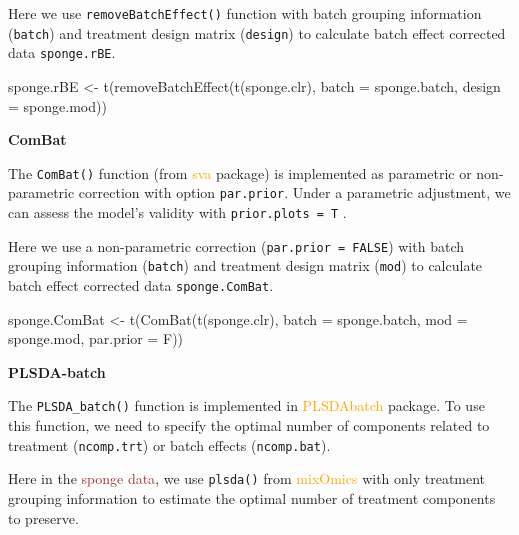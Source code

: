 \documentclass[
]{book}
\newenvironment{Shaded}{\begin{snugshade}}{\end{snugshade}}
\newcommand{\AttributeTok}[1]{\textcolor[rgb]{0.77,0.63,0.00}{#1}}
\newcommand{\FunctionTok}[1]{\textcolor[rgb]{0.00,0.00,0.00}{#1}}
\newcommand{\NormalTok}[1]{#1}
\newcommand{\OtherTok}[1]{\textcolor[rgb]{0.56,0.35,0.01}{#1}}
\begin{document}
Here we use \texttt{removeBatchEffect()} function with batch grouping information (\texttt{batch}) and treatment design matrix (\texttt{design}) to calculate batch effect corrected data \texttt{sponge.rBE}.

\begin{Shaded}
\begin{Highlighting}[]
\NormalTok{sponge.rBE }\OtherTok{\textless{}{-}} \FunctionTok{t}\NormalTok{(}\FunctionTok{removeBatchEffect}\NormalTok{(}\FunctionTok{t}\NormalTok{(sponge.clr), }\AttributeTok{batch =}\NormalTok{ sponge.batch, }
                                  \AttributeTok{design =}\NormalTok{ sponge.mod))}
\end{Highlighting}
\end{Shaded}

\textbf{ComBat}

The \texttt{ComBat()} function (from \textcolor{orange}{sva} package) is implemented as parametric or non-parametric correction with option \texttt{par.prior}. Under a parametric adjustment, we can assess the model's validity with \texttt{prior.plots\ =\ T} \citep{leek2012sva}.

Here we use a non-parametric correction (\texttt{par.prior\ =\ FALSE}) with batch grouping information (\texttt{batch}) and treatment design matrix (\texttt{mod}) to calculate batch effect corrected data \texttt{sponge.ComBat}.

\begin{Shaded}
\begin{Highlighting}[]
\NormalTok{sponge.ComBat }\OtherTok{\textless{}{-}} \FunctionTok{t}\NormalTok{(}\FunctionTok{ComBat}\NormalTok{(}\FunctionTok{t}\NormalTok{(sponge.clr), }\AttributeTok{batch =}\NormalTok{ sponge.batch, }
                          \AttributeTok{mod =}\NormalTok{ sponge.mod, }\AttributeTok{par.prior =}\NormalTok{ F))}
\end{Highlighting}
\end{Shaded}

\textbf{PLSDA-batch}

The \texttt{PLSDA\_batch()} function is implemented in \textcolor{orange}{PLSDAbatch} package. To use this function, we need to specify the optimal number of components related to treatment (\texttt{ncomp.trt}) or batch effects (\texttt{ncomp.bat}).

Here in the \textcolor{brown}{sponge data}, we use \texttt{plsda()} from \textcolor{orange}{mixOmics} with only treatment grouping information to estimate the optimal number of treatment components to preserve.
\end{document}
